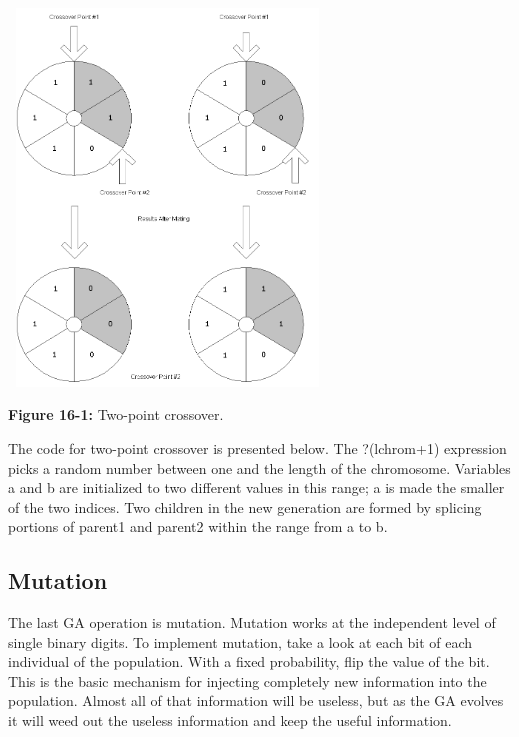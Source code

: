 \begin{center}
\includegraphics[width=3.322in,height=3.9453in]{ub-img/ub-img45.png}
\end{center}

{\sffamily\bfseries Figure 16-1:}
{\sffamily Two-point crossover.}

The code for two-point crossover is presented below. The
\textsf{?(lchrom+1)} expression picks a random number between one and
the length of the chromosome. Variables \textsf{a} and \textsf{b} are
initialized to two different values in this range; \textsf{a} is made
the smaller of the two indices. Two children in the new generation are
formed by splicing portions of \textsf{parent1} and \textsf{parent2}
within the range from \textsf{a} to \textsf{b}.


\subsection{Mutation}

The last GA operation is mutation. Mutation works at the independent
level of single binary digits. To implement mutation, take a look at
each bit of each individual of the population. With a fixed
probability, flip the value of the bit. This is the basic mechanism for
injecting completely new information into the population. Almost all of
that information will be useless, but as the GA evolves it will weed
out the useless information and keep the useful information. 

